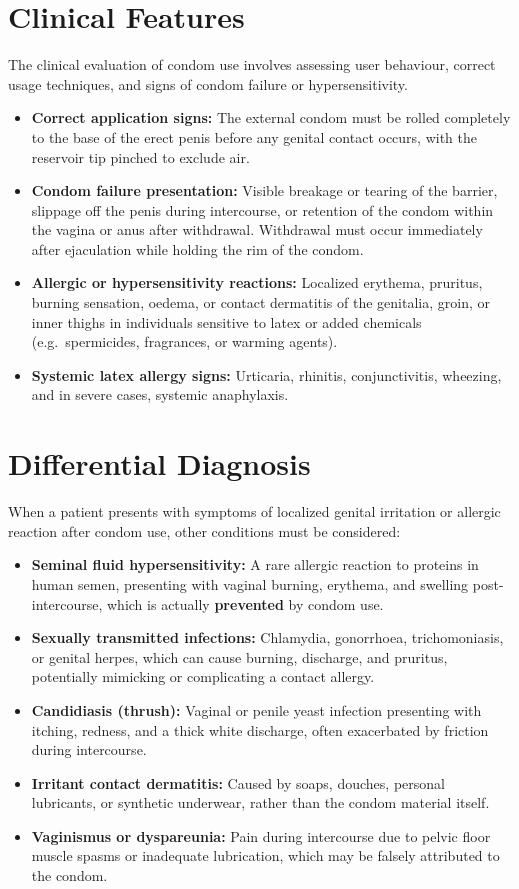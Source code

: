 \section*{Clinical Features}
The clinical evaluation of condom use involves assessing user behaviour, correct usage techniques, and signs of condom failure or hypersensitivity.
\begin{itemize}
    \item \textbf{Correct application signs:} The external condom must be rolled completely to the base of the erect penis before any genital contact occurs, with the reservoir tip pinched to exclude air.
    \item \textbf{Condom failure presentation:} Visible breakage or tearing of the barrier, slippage off the penis during intercourse, or retention of the condom within the vagina or anus after withdrawal. Withdrawal must occur immediately after ejaculation while holding the rim of the condom.
    \item \textbf{Allergic or hypersensitivity reactions:} Localized erythema, pruritus, burning sensation, oedema, or contact dermatitis of the genitalia, groin, or inner thighs in individuals sensitive to latex or added chemicals (e.g.\ spermicides, fragrances, or warming agents).
    \item \textbf{Systemic latex allergy signs:} Urticaria, rhinitis, conjunctivitis, wheezing, and in severe cases, systemic anaphylaxis.
\end{itemize}

\section*{Differential Diagnosis}
When a patient presents with symptoms of localized genital irritation or allergic reaction after condom use, other conditions must be considered:
\begin{itemize}
    \item \textbf{Seminal fluid hypersensitivity:} A rare allergic reaction to proteins in human semen, presenting with vaginal burning, erythema, and swelling post-intercourse, which is actually \textbf{prevented} by condom use.
    \item \textbf{Sexually transmitted infections:} Chlamydia, gonorrhoea, trichomoniasis, or genital herpes, which can cause burning, discharge, and pruritus, potentially mimicking or complicating a contact allergy.
    \item \textbf{Candidiasis (thrush):} Vaginal or penile yeast infection presenting with itching, redness, and a thick white discharge, often exacerbated by friction during intercourse.
    \item \textbf{Irritant contact dermatitis:} Caused by soaps, douches, personal lubricants, or synthetic underwear, rather than the condom material itself.
    \item \textbf{Vaginismus or dyspareunia:} Pain during intercourse due to pelvic floor muscle spasms or inadequate lubrication, which may be falsely attributed to the condom.
\end{itemize}

